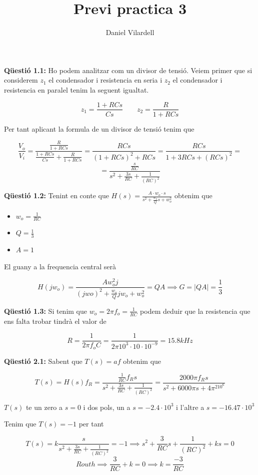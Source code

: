 \documentclass[12pt, a4papre]{article}
\author{Daniel Vilardell}
\title{Previ practica 3}
\date{}
\begin{document}
	\maketitle
	
	\textbf{Qüestió 1.1:} Ho podem analitzar com un divisor de tensió. Veiem primer que si considerem $z_1$ el condensador i resistencia en seria i $z_2$ el condensador i resistencia en paralel tenim la seguent igualtat.
	
	\[
		z_1 = \frac{1+RCs}{Cs} \qquad z_2 = \frac{R}{1+RCs}
	\]
	
	Per tant aplicant la formula de un divisor de tensió tenim que
	
	\[
		\frac{V_o}{V_i} = \frac{\frac{R}{1+RCs}}{\frac{1+RCs}{Cs} + \frac{R}{1+RCs}} = \frac{RCs}{(1+RCs)^2+RCs} = 
		\frac{RCs}{1+3RCs+(RCs)^2}=
	\]
	\[
		= \frac{\frac{s}{RC}}{s^2+\frac{3s}{RC}+\frac{1}{(RC)^2}}
	\]
	
	\textbf{Qüestió 1.2:} Tenint en conte que $H(s) = \frac{A\cdot w_o\cdot s}{s^2+\frac{w_o}{Q}s+w_o^2}$ obtenim que
	
	\begin{itemize}
		\item $w_o = \frac{1}{RC}$
		\item $Q = \frac{1}{3}$
		\item $A = 1$
	\end{itemize}
	
	El guany a la frequencia central serà
	
	\[
		H(jw_o) = \frac{Aw_o^2j}{(jwo)^2+\frac{w_o}{Q}jw_o+w_o^2} = QA \implies G = |QA| = \frac{1}{3}
	\]
	
	\textbf{Qüestió 1.3:} Si tenim que $w_o = 2\pi f_o = \frac{1}{RC}$ podem deduir que la resistencia que ens falta trobar tindrà el valor de 
	
	\[
		R = \frac{1}{2\pi f_oC} = \frac{1}{2\pi 10^3\cdot 10 \cdot 10^{-9}} = 15.8kHz
	\]
	
	\textbf{Qüestió 2.1:} Sabent que $T(s) = af$ obtenim que
	
	\[
		T(s) = H(s)f_R = \frac{\frac{1}{RC}f_R s}{s^2+\frac{3s}{RC}+\frac{1}{(RC)^2}} = \frac{2000\pi f_Rs}{s^2+6000\pi s+4\pi^210^6}
	\]
	
	$T(s)$ te un zero a $s=0$ i dos pols, un a $s=-2.4\cdot 10^3$ i l'altre a $s=-16.47\cdot 10^3$ 
	
	Tenim que $T(s) = -1$ per tant
	
	\[
		T(s) = k\frac{s}{s^2+\frac{3s}{RC}+\frac{1}{(RC)^2}} = -1 \implies s^2+\frac{3}{RC}s+\frac{1}{(RC)^2}+ks = 0
	\] 
	\[
		Routh \implies \frac{3}{RC}+k = 0 \implies k = \frac{-3}{RC}
	\]
	
\end{document}
